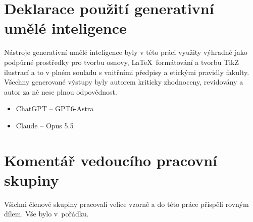 \documentclass[11pt,a4paper,oneside]{report}
\begin{document}
\hypersetup{pageanchor=false}

\hypersetup{pageanchor=true}
{\small{}\tableofcontents}
\clearpage
{}







{\renewcommand*{\bibfont}{\footnotesize}\setlength{\bibitemsep}{0pt}\appto{}\printbibliography[heading=bibintoc,title={Literatura},notkeyword=obrazek]
\printbibliography[heading=bibintoc,title={Zdroje obrázků},keyword=obrazek]}
\section*{Deklarace použití generativní umělé inteligence}
Nástroje generativní umělé inteligence byly v této práci využity výhradně jako podpůrné prostředky pro tvorbu osnovy, \LaTeX\ formátování a tvorbu TikZ ilustrací a to v
plném souladu s vnitřními předpisy a etickými pravidly fakulty. Všechny generované
výstupy byly autorem kriticky zhodnoceny, revidovány a autor za ně nese plnou odpovědnost.
\begin{itemize}
    \item ChatGPT -- GPT6-Astra
    \item Claude -- Opus 5.5
\end{itemize}

\section*{Komentář vedoucího pracovní skupiny}
Všichni členové skupiny pracovali velice vzorně a do této práce přispěli rovným dílem. Vše bylo v~pořádku.
\end{document}
